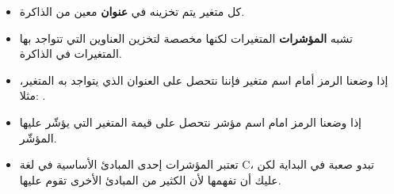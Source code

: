 \begin{itemize}
	\item كل متغير يتم تخزينه في
\textbf{عنوان}
معين من الذاكرة.
	\item تشبه
\textbf{المؤشرات}
المتغيرات لكنها مخصصة لتخزين العناوين التي تتواجد بها المتغيرات في الذاكرة.
	\item إذا وضعنا الرمز
\InlineCode{\&}
أمام اسم متغير فإننا نتحصل على العنوان الذي يتواجد به المتغير، مثلا:
.
	\item إذا وضعنا الرمز
\InlineCode{*}
امام اسم مؤشر نتحصل على قيمة المتغير التي يؤشّر عليها المؤشّر.
	\item تعتبر المؤشرات إحدى المبادئ الأساسية في لغة \textenglish{C}، تبدو صعبة في البداية لكن عليك أن تفهمها لأن الكثير من المبادئ الأخرى تقوم عليها.
\end{itemize}
